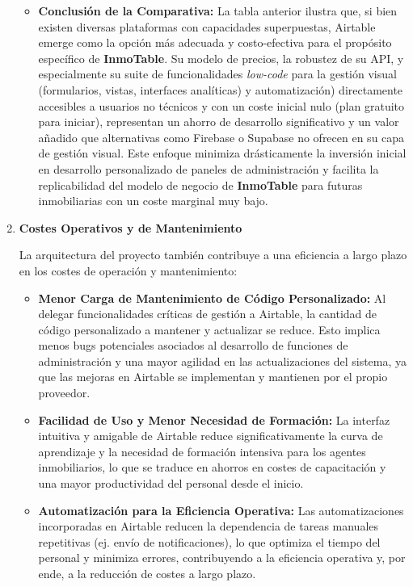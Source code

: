 \begin{enumerate}
    \begin{itemize}
        \item \textbf{Conclusión de la Comparativa:} La tabla anterior ilustra que, si bien existen diversas plataformas con capacidades superpuestas, Airtable emerge como la opción más adecuada y costo-efectiva para el propósito específico de \textbf{InmoTable}. Su modelo de precios, la robustez de su API, y especialmente su suite de funcionalidades \textit{low-code} para la gestión visual (formularios, vistas, interfaces analíticas) y automatización) directamente accesibles a usuarios no técnicos y con un coste inicial nulo (plan gratuito para iniciar), representan un ahorro de desarrollo significativo y un valor añadido que alternativas como Firebase o Supabase no ofrecen en su capa de gestión visual. Este enfoque minimiza drásticamente la inversión inicial en desarrollo personalizado de paneles de administración y facilita la replicabilidad del modelo de negocio de \textbf{InmoTable} para futuras inmobiliarias con un coste marginal muy bajo.
    \end{itemize}

\clearpage

    \item \textbf{Costes Operativos y de Mantenimiento}
    
    La arquitectura del proyecto también contribuye a una eficiencia a largo plazo en los costes de operación y mantenimiento:

    \begin{itemize}
        \item \textbf{Menor Carga de Mantenimiento de Código Personalizado:} Al delegar funcionalidades críticas de gestión a Airtable, la cantidad de código personalizado a mantener y actualizar se reduce. Esto implica menos bugs potenciales asociados al desarrollo de funciones de administración y una mayor agilidad en las actualizaciones del sistema, ya que las mejoras en Airtable se implementan y mantienen por el propio proveedor.

        \item \textbf{Facilidad de Uso y Menor Necesidad de Formación:} La interfaz intuitiva y amigable de Airtable reduce significativamente la curva de aprendizaje y la necesidad de formación intensiva para los agentes inmobiliarios, lo que se traduce en ahorros en costes de capacitación y una mayor productividad del personal desde el inicio.

        \item \textbf{Automatización para la Eficiencia Operativa:} Las automatizaciones incorporadas en Airtable reducen la dependencia de tareas manuales repetitivas (ej. envío de notificaciones), lo que optimiza el tiempo del personal y minimiza errores, contribuyendo a la eficiencia operativa y, por ende, a la reducción de costes a largo plazo.
    \end{itemize}


\end{enumerate}
